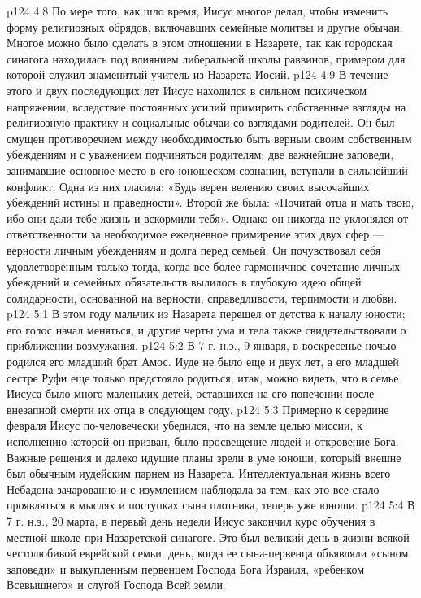 \vs p124 4:8 По мере того, как шло время, Иисус многое делал, чтобы изменить форму религиозных обрядов, включавших семейные молитвы и другие обычаи. Многое можно было сделать в этом отношении в Назарете, так как городская синагога находилась под влиянием либеральной школы раввинов, примером для которой служил знаменитый учитель из Назарета Иосий.
\vs p124 4:9 В течение этого и двух последующих лет Иисус находился в сильном психическом напряжении, вследствие постоянных усилий примирить собственные взгляды на религиозную практику и социальные обычаи со взглядами родителей. Он был смущен противоречием между необходимостью быть верным своим собственным убеждениям и с уважением подчиняться родителям; две важнейшие заповеди, занимавшие основное место в его юношеском сознании, вступали в сильнейший конфликт. Одна из них гласила: «Будь верен велению своих высочайших убеждений истины и праведности». Второй же была: «Почитай отца и мать твою, ибо они дали тебе жизнь и вскормили тебя». Однако он никогда не уклонялся от ответственности за необходимое ежедневное примирение этих двух сфер --- верности личным убеждениям и долга перед семьей. Он почувствовал себя удовлетворенным только тогда, когда все более гармоничное сочетание личных убеждений и семейных обязательств вылилось в глубокую идею общей солидарности, основанной на верности, справедливости, терпимости и любви.
\vs p124 5:1 В этом году мальчик из Назарета перешел от детства к началу юности; его голос начал меняться, и другие черты ума и тела также свидетельствовали о приближении возмужания.
\vs p124 5:2 В 7 г. н.э., 9 января, в воскресенье ночью родился его младший брат Амос. Иуде не было еще и двух лет, а его младшей сестре Руфи еще только предстояло родиться; итак, можно видеть, что в семье Иисуса было много маленьких детей, оставшихся на его попечении после внезапной смерти их отца в следующем году.
\vs p124 5:3 \pc Примерно к середине февраля Иисус по\hyp{}человечески убедился, что на земле целью миссии, к исполнению которой он призван, было просвещение людей и откровение Бога. Важные решения и далеко идущие планы зрели в уме юноши, который внешне был обычным иудейским парнем из Назарета. Интеллектуальная жизнь всего Небадона зачарованно и с изумлением наблюдала за тем, как это все стало проявляться в мыслях и поступках сына плотника, теперь уже юноши.
\vs p124 5:4 \pc В 7 г. н.э., 20 марта, в первый день недели Иисус закончил курс обучения в местной школе при Назаретской синагоге. Это был великий день в жизни всякой честолюбивой еврейской семьи, день, когда ее сына\hyp{}первенца объявляли «сыном заповеди» и выкупленным первенцем Господа Бога Израиля, «ребенком Всевышнего» и слугой Господа Всей земли.
